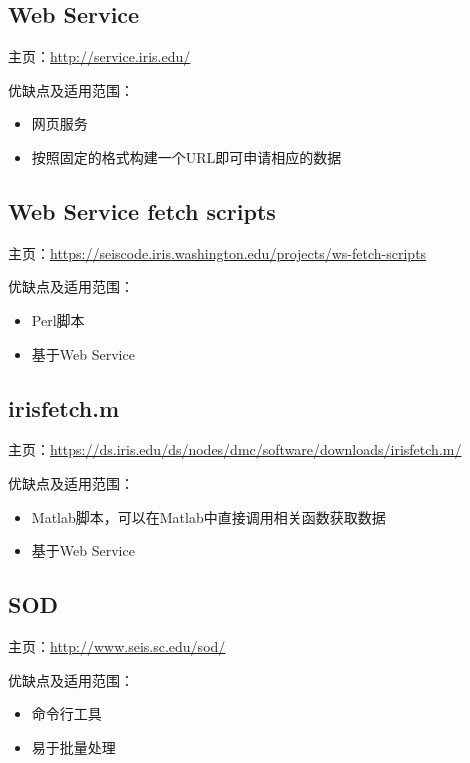 \subsection{Web Service}
\noindent 主页：\url{http://service.iris.edu/}

\noindent 优缺点及适用范围：
\begin{itemize}
\item 网页服务
\item 按照固定的格式构建一个URL即可申请相应的数据
\end{itemize}

\subsection{Web Service fetch scripts}
\noindent 主页：\url{https://seiscode.iris.washington.edu/projects/ws-fetch-scripts}

\noindent 优缺点及适用范围：
\begin{itemize}
\item Perl脚本
\item 基于Web Service
\end{itemize}

\subsection{irisfetch.m}
\noindent 主页：\url{https://ds.iris.edu/ds/nodes/dmc/software/downloads/irisfetch.m/}

\noindent 优缺点及适用范围：
\begin{itemize}
\item Matlab脚本，可以在Matlab中直接调用相关函数获取数据
\item 基于Web Service
\end{itemize}

\subsection{SOD}
\noindent 主页：\url{http://www.seis.sc.edu/sod/}

\noindent 优缺点及适用范围：
\begin{itemize}
\item 命令行工具
\item 易于批量处理
\end{itemize}

